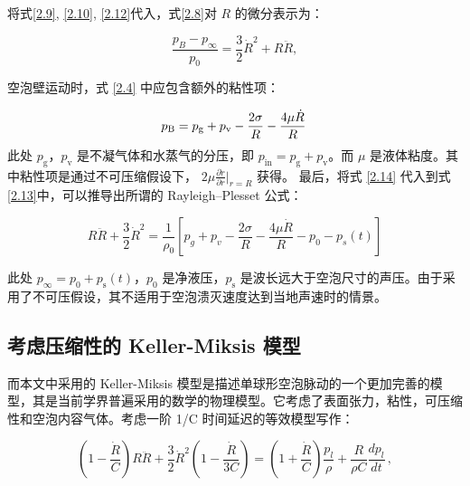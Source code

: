  将式\ref{2.9}, \ref{2.10}, \ref{2.12}代入，式\ref{2.8}对 $R$ 的微分表示为：

\begin{equation}
\frac { p _ { B } - p _ { \infty } } { p _ { 0 } } = \frac { 3 } { 2 } \dot R ^ { 2 } + R\ddot R ,
    \label{2.13}
\end{equation}

 空泡壁运动时，式 \ref{2.4} 中应包含额外的粘性项： 

\begin{equation}
p _ \mathrm { B } = p _ \mathrm { g } + p _ \mathrm { v } - \frac { 2 \sigma } { R } - \frac { 4 \mu \dot R } { R }\\\,
    \label{2.14}
\end{equation}
 此处 $p _ \mathrm { g }$，$p _ \mathrm { v }$
是不凝气体和水蒸气的分压，即
$p_\mathrm {in }=p _ \mathrm { g } + p _ \mathrm { v }$。而 $\mu$
是液体粘度。其中粘性项是通过不可压缩假设下，
$2\mu \frac { \partial \dot r } { \partial r } | _ { r =R }$ 获得。
最后，将式 \ref{2.14} 代入到式 \ref{2.13}中，可以推导出所谓的 Rayleigh--Plesset
公式：

\begin{equation}
R \ddot R + \frac { 3 } { 2 } \dot R ^ { 2 } = \frac { 1 } { \rho _ { 0 } } [ p _ { g } + p _ { v } - \frac { 2 \sigma } { R } - \frac { 4 \mu \dot { R } } { R } - p _ { 0 } - p _ { s } ( t ) ] 
    \label{2.15}
\end{equation}
 
 此处
$p_{\infty}=p _\mathrm { 0 } + p _\mathrm { s } ( t )$，$p_0$
是净液压，$p_\mathrm{s }$
是波长远大于空泡尺寸的声压。由于采用了不可压假设，其不适用于空泡溃灭速度达到当地声速时的情景。
\medskip
\bigskip

\subsection{考虑压缩性的 Keller-Miksis
模型}

而本文中采用的 Keller-Miksis
模型是描述单球形空泡脉动的一个更加完善的模型，其是当前学界普遍采用的数学的物理模型。它考虑了表面张力，粘性，可压缩性和空泡内容气体\cite{lauterborn_cavitation_1997,Brennen2003,keller_bubble_1980}。考虑一阶
1/C 时间延迟的等效模型写作：

\begin{equation}
    \left(1-\frac{\dot{R}}{C}\right) R \ddot{R}+\frac{3}{2} \dot{R}^{2}\left(1-\frac{\dot{R}}{3 C}\right)=\left(1+\frac{\dot{R}}{C}\right) \frac{p_{l}}{\rho}+\frac{R}{\rho C} \frac{d p_{l}}{d t}\,,
    \label{km}
\end{equation}



